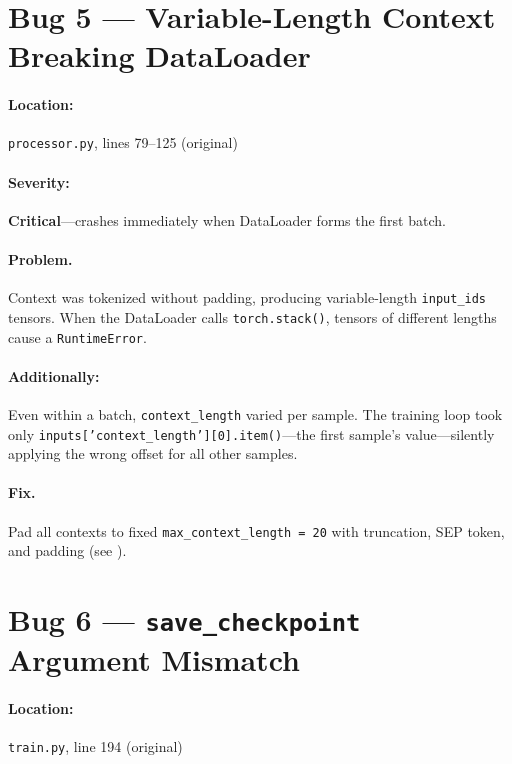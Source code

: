 \documentclass[11pt, a4paper]{report}
\begin{document}
\section{Bug 5 --- Variable-Length Context Breaking DataLoader}
\label{sec:bug5}

\paragraph{Location:} \texttt{processor.py}, lines 79--125 (original)

\paragraph{Severity:} \textbf{Critical}---crashes immediately when DataLoader forms the first batch.

\paragraph{Problem.} Context was tokenized without padding, producing variable-length \texttt{input\_ids} tensors. When the DataLoader calls \texttt{torch.stack()}, tensors of different lengths cause a \texttt{RuntimeError}.

\paragraph{Additionally:} Even within a batch, \texttt{context\_length} varied per sample. The training loop took only \texttt{inputs['context\_length'][0].item()}---the first sample's value---silently applying the wrong offset for all other samples.

\paragraph{Fix.} Pad all contexts to fixed \texttt{max\_context\_length = 20} with truncation, SEP token, and padding (see ).

\section{Bug 6 --- \texttt{save\_checkpoint} Argument Mismatch}
\label{sec:bug6}

\paragraph{Location:} \texttt{train.py}, line 194 (original)
\end{document}
